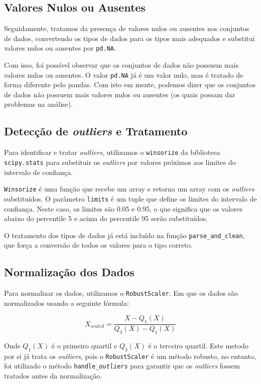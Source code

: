 \documentclass{article}
\begin{document}
    \subsection{Valores Nulos ou Ausentes}
    Seguidamente, tratamos da presença de valores nulos ou ausentes nos conjuntos de dados, convertendo os tipos de dados para os tipos mais adequados e substitui valores nulos ou ausentes por \texttt{pd.NA}.

    Com isso, foi possível observar que os conjuntos de dados não possuem mais valores nulos ou ausentes. O valor \texttt{pd.NA} já é um valor nulo, mas é tratado de forma diferente pelo pandas. Com isto em mente, podemos dizer que os conjuntos de dados não possuem mais valores nulos ou ausentes (os quais possam dar problemas na análise).

    \subsection{Detecção de \textit{outliers} e Tratamento}
    Para identificar e tratar \textit{outliers}, utilizamos o \texttt{winsorize} da biblioteca \texttt{scipy.stats} para substituir os \textit{outliers} por valores próximos aos limites do intervalo de confiança.

    \texttt{Winsorize} é uma função que recebe um array e retorna um array com os \textit{outliers} substituídos. O parâmetro \texttt{limits} é um tuple que define os limites do intervalo de confiança. Neste caso, os limites são 0.05 e 0.95, o que significa que os valores abaixo do percentile 5 e acima do percentile 95 serão substituídos.

    O tratamento dos tipos de dados já está incluído na função \texttt{parse\_and\_clean}, que força a conversão de todos os valores para o tipo correto.

    \subsection{Normalização dos Dados}
    Para normalizar os dados, utilizamos o \texttt{RobustScaler}. Em que os dados são normalizados usando a seguinte fórmula:

    \begin{equation}
        X_{scaled} = \frac{X - Q_1(X)}{Q_3(X) - Q_1(X)}
    \end{equation}

    Onde $Q_1(X)$ é o primeiro quartil e $Q_3(X)$ é o terceiro quartil.
    Este metodo por si já trata os \textit{outliers}, pois o \texttt{RobustScaler} é um método robusto, no entanto, foi utilizado o método \texttt{handle\_\textit{outliers}} para garantir que os \textit{outliers} fossem tratados antes da normalização.
\end{document}
